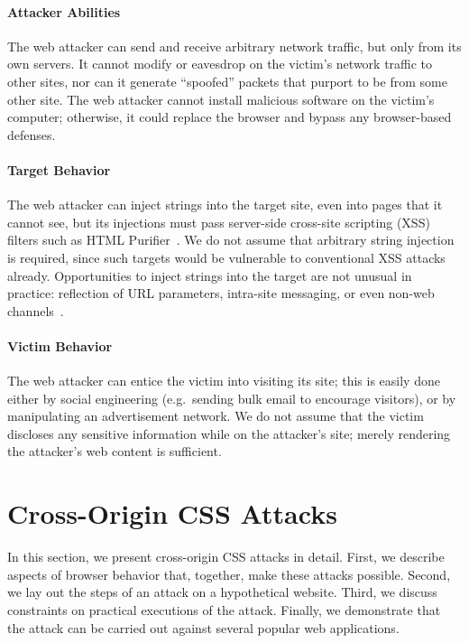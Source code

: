 \documentclass{acm_proc_article-sp}
\begin{document}
\paragraph{Attacker Abilities}
The web attacker can send and receive arbitrary network traffic, but
only from its own servers. It cannot modify or eavesdrop on the
victim's network traffic to other sites, nor can it generate “spoofed”
packets that purport to be from some other site. The web attacker
cannot install malicious software on the victim's computer; otherwise,
it could replace the browser and bypass any browser-based defenses.

\paragraph{Target Behavior}
The web attacker can inject strings into the target site, even into
pages that it cannot see, but its injections must pass server-side
cross-site scripting (XSS) filters such as HTML
Purifier~\cite{htmlpurifier}.  We do not assume that arbitrary string
injection is required, since such targets would be vulnerable to
conventional XSS attacks already.  Opportunities to inject strings
into the target are not unusual in practice: reflection of URL
parameters, intra-site messaging, or even non-web channels~\cite{xcs}.

\paragraph{Victim Behavior}
The web attacker can entice the victim into visiting its site; this is
easily done either by social engineering (e.g.\ sending bulk email to
encourage visitors), or by manipulating an advertisement network. We
do not assume that the victim discloses any sensitive information
while on the attacker's site; merely rendering the attacker's web
content is sufficient.

\section{Cross-Origin CSS Attacks} \label{sec:attacks}

In this section, we present cross-origin CSS attacks in detail.
First, we describe aspects of browser behavior that, together,
make these attacks possible.  Second, we lay out the steps of an
attack on a hypothetical website.  Third, we discuss constraints on
practical executions of the attack.  Finally, we demonstrate that the
attack can be carried out against several popular web applications.
\end{document}
